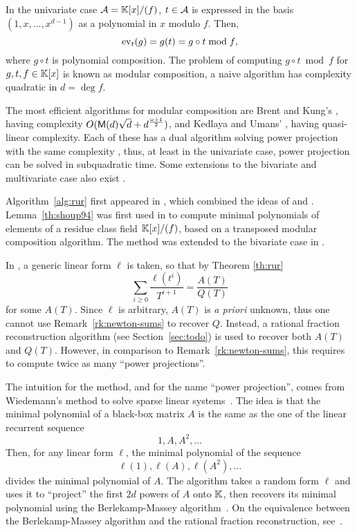 \begin{remark}
  In the univariate case $\mathcal{A}=\mathbb{K}[x]/(f)$, $t\in\mathcal{A}$ is
  expressed in the basis $(1,x,\ldots,x^{d-1})$ as a polynomial in $x$
  modulo $f$. Then,
  \[\operatorname{ev}_t(g) = g(t) = g\circ t \bmod f\text{,}\]
  where $g\circ t$ is polynomial composition. The problem of computing
  $g\circ t\bmod f$ for $g,t,f\in\mathbb{K}[x]$ is known as modular
  composition, a naive algorithm has complexity quadratic in $d=\deg f$.
  
  The most efficient algorithms for modular composition are Brent and
  Kung's \cite{brent+kung}, having complexity $O(\mathsf{M}(d)\sqrt{d} +
  d^{\frac{\omega+1}{2}})$, and Kedlaya and Umans'
  \cite{umans:08,kedlaya+umans08}, having quasi-linear
  complexity. Each of these has a dual algorithm solving power
  projection with the same complexity \cite{shoup94,kedlaya+umans08},
  thus, at least in the univariate case, power projection can be
  solved in subquadratic time.  Some extensions to the bivariate and
  multivariate case also exist \cite{shoup99,kedlaya+umans08}.
\end{remark}

\begin{nota}
  Algorithm~\ref{alg:rur} first appeared in
  \cite{bostan+salvy+schost03}, which combined the ideas of
  \cite{rouiller99} and \cite{shoup94,shoup99}. Lemma~\ref{th:shoup94}
  was first used in \cite{shoup94} to compute minimal polynomials of
  elements of a residue class field $\mathbb{K}[x]/(f)$, based on a transposed
  modular composition algorithm. The method was extended to the
  bivariate case in \cite{shoup99}.
  
  In \cite{shoup94,shoup99}, a generic linear form $\ell$ is taken, so
  that by Theorem \ref{th:rur}
  \[\sum_{i\ge0}\frac{\ell(t^i)}{T^{i+1}}=\frac{A(T)}{Q(T)}\]
  for some $A(T)$. Since $\ell$ is arbitrary, $A(T)$ is \emph{a
    priori} unknown, thus one cannot use Remark~\ref{rk:newton-sums}
  to recover $Q$. Instead, a rational fraction reconstruction
  algorithm (see Section~\ref{sec:todo}) is used to recover both
  $A(T)$ and $Q(T)$. However, in comparison to
  Remark~\ref{rk:newton-sums}, this requires to compute twice as many
  ``power projections''.
  
  The intuition for the method, and for the name ``power projection'',
  comes from Wiedemann's method to solve sparse linear
  systems~\cite{wiedemann:sparse}. The idea is that the minimal
  polynomial of a black-box matrix $A$ is the same as the one of the
  linear recurrent sequence
  \[1,A,A^2,\ldots\] 
  Then, for any linear form $\ell$, the minimal polynomial of the sequence
  \[\ell(1),\ell(A),\ell(A^2),\ldots\]
  divides the minimal polynomial of $A$. The algorithm takes a random
  form $\ell$ and uses it to ``project'' the first $2d$ powers of $A$
  onto $\mathbb{K}$, then recovers its minimal polynomial using the
  Berlekamp-Massey algorithm~\cite{massey69}. On the equivalence
  between the Berlekamp-Massey algorithm and the rational fraction
  reconstruction, see~\cite{dornstetter87}.
\end{nota}


